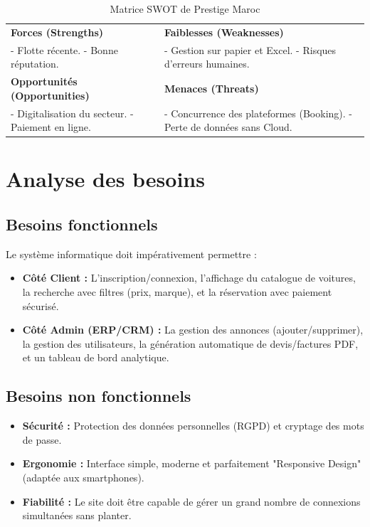 \begin{table}[H]
    \centering
    \renewcommand{\arraystretch}{1.5}
    \begin{tabular}{|p{7cm}|p{7cm}|}
        \hline
        \cellcolor{green!15}\textbf{Forces (Strengths)} & \cellcolor{red!15}\textbf{Faiblesses (Weaknesses)} \\
        - Flotte récente. \newline - Bonne réputation. & - Gestion sur papier et Excel. \newline - Risques d'erreurs humaines. \\
        \hline
        \cellcolor{blue!15}\textbf{Opportunités (Opportunities)} & \cellcolor{orange!15}\textbf{Menaces (Threats)} \\
        - Digitalisation du secteur. \newline - Paiement en ligne. & - Concurrence des plateformes (Booking). \newline - Perte de données sans Cloud. \\
        \hline
    \end{tabular}
    \caption{Matrice SWOT de Prestige Maroc}
\end{table}

\section{Analyse des besoins}

\subsection{Besoins fonctionnels}
Le système informatique doit impérativement permettre :
\begin{itemize}
    \item \textbf{Côté Client :} L'inscription/connexion, l'affichage du catalogue de voitures, la recherche avec filtres (prix, marque), et la réservation avec paiement sécurisé.
    \item \textbf{Côté Admin (ERP/CRM) :} La gestion des annonces (ajouter/supprimer), la gestion des utilisateurs, la génération automatique de devis/factures PDF, et un tableau de bord analytique.
\end{itemize}

\subsection{Besoins non fonctionnels}
\begin{itemize}
    \item \textbf{Sécurité :} Protection des données personnelles (RGPD) et cryptage des mots de passe.
    \item \textbf{Ergonomie :} Interface simple, moderne et parfaitement "Responsive Design" (adaptée aux smartphones).
    \item \textbf{Fiabilité :} Le site doit être capable de gérer un grand nombre de connexions simultanées sans planter.
\end{itemize}
